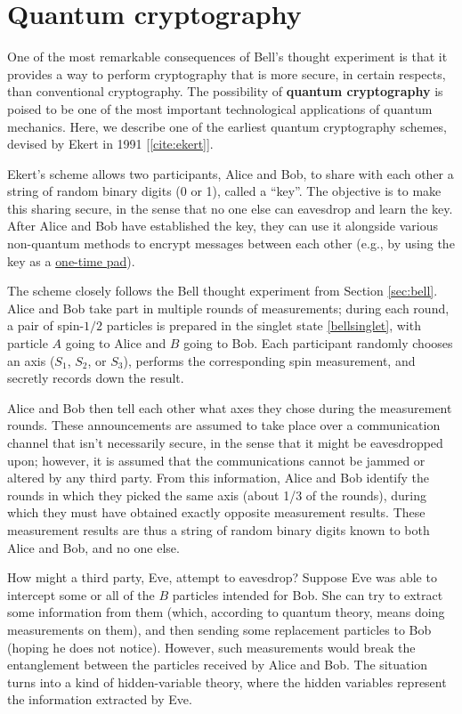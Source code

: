 \documentclass[pra,12pt]{revtex4-2}
\begin{document}
\section{Quantum cryptography}

One of the most remarkable consequences of Bell's thought experiment
is that it provides a way to perform cryptography that is more secure,
in certain respects, than conventional cryptography.  The possibility
of \textbf{quantum cryptography} is poised to be one of the most
important technological applications of quantum mechanics.  Here, we
describe one of the earliest quantum cryptography schemes, devised by
Ekert in 1991 [\ref{cite:ekert}].

Ekert's scheme allows two participants, Alice and Bob, to share with
each other a string of random binary digits (0 or 1), called a
``key''.  The objective is to make this sharing secure, in the sense
that no one else can eavesdrop and learn the key.  After Alice and Bob
have established the key, they can use it alongside various
non-quantum methods to encrypt messages between each other (e.g., by using the key as a
\href{https://en.wikipedia.org/wiki/One-time_pad}{one-time pad}).

The scheme closely follows the Bell thought experiment from Section
\ref{sec:bell}.  Alice and Bob take part in multiple rounds of
measurements; during each round, a pair of spin-$1/2$ particles is
prepared in the singlet state \eqref{bellsinglet}, with particle $A$
going to Alice and $B$ going to Bob.  Each participant randomly
chooses an axis ($S_1$, $S_2$, or $S_3$), performs the corresponding
spin measurement, and secretly records down the result.

Alice and Bob then tell each other what axes they chose during the
measurement rounds.  These announcements are assumed to take place
over a communication channel that isn't necessarily secure, in the
sense that it might be eavesdropped upon; however, it is assumed that
the communications cannot be jammed or altered by any third party.
From this information, Alice and Bob identify the rounds in which they
picked the same axis (about 1/3 of the rounds), during which they must
have obtained exactly opposite measurement results.  These measurement
results are thus a string of random binary digits known to both Alice
and Bob, and no one else.

How might a third party, Eve, attempt to eavesdrop?  Suppose Eve was
able to intercept some or all of the $B$ particles intended for Bob.
She can try to extract some information from them (which, according to
quantum theory, means doing measurements on them), and then sending
some replacement particles to Bob (hoping he does not notice).
However, such measurements would break the entanglement between the
particles received by Alice and Bob.  The situation turns into a kind
of hidden-variable theory, where the hidden variables represent the
information extracted by Eve.
\end{document}
